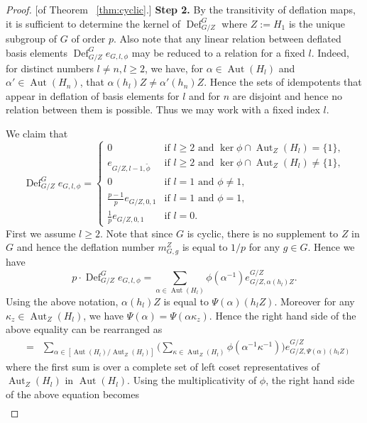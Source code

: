 \documentclass[10pt,a4paper]{amsart}
\newcommand{\Aut}{\operatorname{Aut}}
\newcommand{\defl}{\operatorname{Def}}
\begin{document}
\begin{proof}{[of Theorem ~\ref{thm:cyclic}.]}
\smallskip
\noindent\textbf{Step 2.} By the transitivity of deflation maps, it is sufficient to determine the kernel of $\defl^G_{G/Z}$ where $Z:= H_1$ is the unique subgroup of $G$ of order $p$. Also note that any linear relation between deflated basis elements $\defl^G_{G/Z}e_{G, l, \phi}$ may be reduced to a relation for a fixed $l$. Indeed, for distinct numbers $l\not = n, l\ge 2$, we have, for $\alpha\in \Aut(H_l)$ and $\alpha'\in\Aut(H_n)$, that $\alpha(h_l)Z\not = \alpha'(h_n)Z$. Hence the sets of idempotents that appear in deflation of basis elements for $l$ and for $n$ are disjoint and hence no relation between them is possible. Thus we may work with a fixed index $l$.

We claim that
\begin{equation}\label{eqn:deftoZ}
  \defl^G_{G/Z} e_{G, l, \phi} =\begin{cases}
              0 & \text{if } l\ge 2 \text{ and }\ker\phi\cap \Aut_Z(H_l) = \{1\},\\
            e_{G/Z, l-1, \tilde\phi} & \text{if } l\ge 2 \text{ and }\ker\phi\cap \Aut_Z(H_l) \not = \{1\},\\
                          0 & \text{if } l = 1 \text{ and }\phi \not = 1,\\
            \frac{p-1}{p}e_{G/Z, 0, 1} & \text{if } l = 1 \text{ and } \phi = 1,\\
            \frac{1}{p}e_{G/Z, 0, 1} & \text{if } l = 0.
          \end{cases}
\end{equation}
First we assume $l\ge 2$. Note that since $G$ is cyclic, there is no supplement to $Z$ in $G$ and hence the deflation number $m_{G, g}^Z$ is equal to $1/p$ for any $g\in G$. Hence we have
\[
p\cdot \defl^G_{G/Z} e_{G, l, \phi} = \sum_{\alpha\in\Aut(H_l)}\phi(\alpha^{-1}) e_{G/Z, \alpha(h_l)Z}^{G/Z}.
\]
Using the above notation, $\alpha(h_l)Z$ is equal to $\Psi(\alpha)(h_lZ)$. Moreover for any $\kappa_z\in\Aut_Z(H_l)$, we have $\Psi(\alpha) = \Psi(\alpha\kappa_z)$. Hence the right hand side of the above equality can be rearranged as
\begin{eqnarray*}
&=& \sum_{\alpha\in [\Aut(H_l)/\Aut_Z(H_l)]} \Big(\sum_{\kappa\in\Aut_Z(H_l)}\phi(\alpha^{-1}\kappa^{-1})\Big) e_{G/Z, \Psi(\alpha)(h_lZ)}^{G/Z}
\end{eqnarray*}
where the first sum is over a complete set of left coset representatives of $\Aut_Z(H_l)$ in $\Aut(H_l)$. Using the multiplicativity of $\phi$, the right hand side of the above equation becomes
\begin{eqnarray*}

\end{eqnarray*}
\end{proof}
\end{document}
